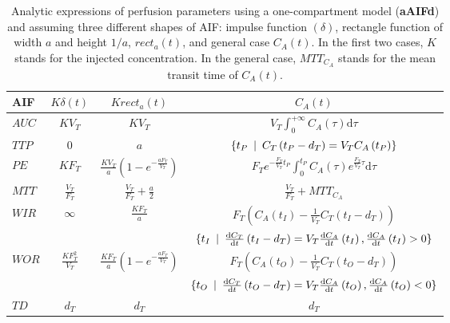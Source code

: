 \begin{table}[!h]
\begin{center}
\begin{tabular}{lccc}
\toprule
AIF & \textbf{$K\delta\left(t\right)$} & $K rect_a\left(t\right)$ & $C_A \left(t\right)$ \\
\midrule
\textbf{$AUC$} & $KV_T$ & $KV_T$ & $V_T \int_{0}^{+\infty}C_A\left(\tau\right)\mathrm d\tau$\\
\midrule
\textbf{$TTP$} & 0  & $a$ & $\{ t_P \enskip\vert\enskip C_T\left(t_P - d_T\right) = V_T C_A\left(t_P \right)\}$ \\
\midrule
\textbf{$PE$} &  $KF_T$ & $\frac{KV_T}{a}\left(1-e^{-\frac{aF_T}{V_T}}\right)$ & $F_Te^{-\frac{F_T}{V_T} t_P}\int_{0}^{t_P}C_A\left(\tau\right)e^{\frac{F_T}{V_T} \tau}\mathrm d\tau$ \\
\midrule
\textbf{$MTT$} & $\frac{V_T}{F_T}$ & $\frac{V_T}{F_T} + \frac{a}{2}$ & $\frac{V_T}{F_T} + MTT_{C_A}$ \\
\midrule
\multirow{2}{*}{\textbf{$WIR$}}
 &  \multirow{2}{*}{$\infty$} & \multirow{2}{*}{{$\frac{KF_T}{a}$}} & $F_T\left(C_A\left(t_{I}\right)-\frac{1}{V_T}C_T\left(t_{I} - d_T\right)\right)$ \\
&  & & $\{ t_{I} \enskip\vert\enskip \frac{\mathrm d C_T}{\mathrm dt}\left(t_{I} - d_T\right) = V_T \frac{\mathrm d C_A}{\mathrm dt}\left(t_{I}\right), \frac{\mathrm d C_A}{\mathrm d t}\left(t_{I}\right) > 0\}$ \\
\midrule
\multirow{2}{*}{$WOR$} &  \multirow{2}{*}{$\frac{KF_T^2}{V_T}$} & \multirow{2}{*}{$\frac{KF_T}{a}\left( 1-e^{-\frac{aF_T}{V_T}} \right)$} & $F_T\left(C_A\left(t_{O}\right)-\frac{1}{V_T}C_T\left(t_{O} - d_T\right)\right)$ \\
& & & $\{ t_{O} \enskip\vert\enskip \frac{\mathrm d C_T}{\mathrm d t}\left(t_{O} - d_T\right) = V_T \frac{\mathrm d C_A}{\mathrm d t}\left(t_{O}\right),\frac{\mathrm d C_A}{\mathrm d t}\left(t_{O}\right) < 0\}$ \\
\midrule
$TD$ & $d_T$ & $d_T$ & $d_T$ \\
\bottomrule
\end{tabular}
\caption{Analytic expressions of perfusion parameters using a one-compartment model (\textbf{aAIFd}) and assuming three different shapes of AIF: impulse  function $(\delta)$, rectangle function of width $a$ and height $1/a$, $rect_a(t)$, and general case $C_A(t)$. In the first two cases, $K$ stands for the injected concentration. In the general case, $MTT_{C_A}$ stands for the mean transit time of $C_A(t)$.}
\label{tab:AnalyticRelationAIF}
\end{center}
\end{table}

